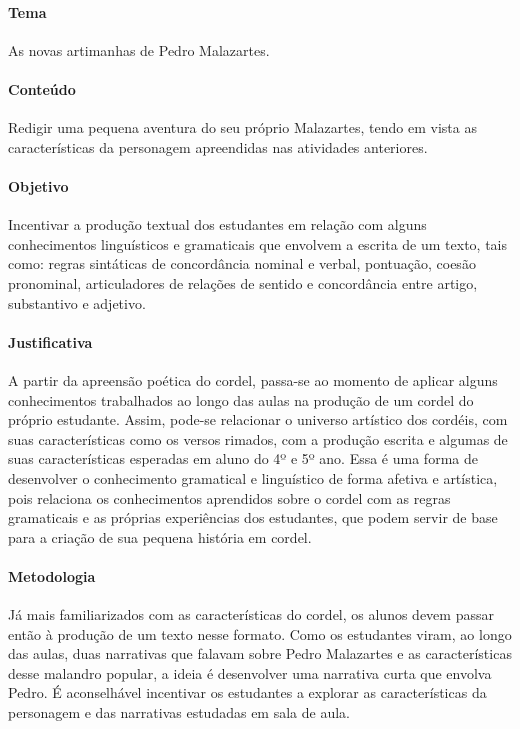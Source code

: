 \documentclass[11pt]{extarticle}
\begin{document}
\paragraph{Tema} As novas artimanhas de Pedro Malazartes. 

\paragraph{Conteúdo} Redigir uma pequena aventura do seu próprio Malazartes, tendo em vista as características da personagem apreendidas nas atividades anteriores.


\paragraph{Objetivo} Incentivar a produção textual dos estudantes em relação com alguns conhecimentos linguísticos e gramaticais que envolvem a escrita de um texto, tais como: regras sintáticas de concordância nominal e verbal, pontuação, coesão pronominal, articuladores de relações de sentido e concordância entre artigo, substantivo e adjetivo.

\paragraph{Justificativa} A partir da apreensão poética do cordel, passa-se ao momento de aplicar alguns conhecimentos trabalhados ao longo das aulas na produção de um cordel do próprio estudante. Assim, pode-se relacionar o universo artístico dos cordéis, com suas características como os versos rimados, com a produção escrita e algumas de suas características esperadas em aluno do 4º e 5º ano. Essa é uma forma de desenvolver o conhecimento gramatical e linguístico de forma afetiva e artística, pois relaciona os conhecimentos aprendidos sobre o cordel com as regras gramaticais e as próprias experiências dos estudantes, que podem servir de base para a criação de sua pequena história em cordel.


\paragraph{Metodologia} Já mais familiarizados com as características do cordel, os alunos devem passar então à produção de um texto nesse formato. Como os estudantes viram, ao longo das aulas, duas narrativas que falavam sobre Pedro Malazartes e as características desse malandro popular, a ideia é desenvolver uma narrativa curta que envolva Pedro.
É aconselhável incentivar os estudantes a explorar as características da personagem e das narrativas estudadas em sala de aula.
\end{document}
